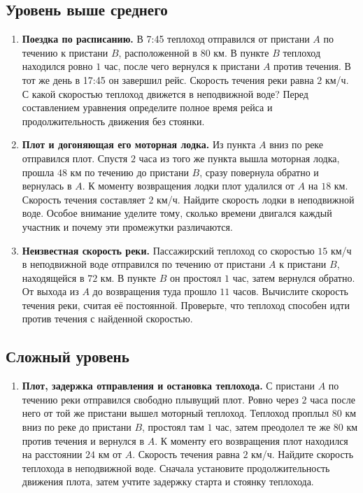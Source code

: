 \documentclass[a4paper,12pt]{article}
\begin{document}
\subsection*{Уровень выше среднего}
\begin{enumerate}[label=\textcolor{accent}{\bfseries\arabic*.},leftmargin=8mm,itemsep=12pt,start=7]
\item \textbf{Поездка по расписанию.} В 7:45 теплоход отправился от пристани $A$ по течению к пристани $B$, расположенной в $80$ км. В пункте $B$ теплоход находился ровно $1$ час, после чего вернулся к пристани $A$ против течения. В тот же день в 17:45 он завершил рейс. Скорость течения реки равна $2$ км/ч. С какой скоростью теплоход движется в неподвижной воде? Перед составлением уравнения определите полное время рейса и продолжительность движения без стоянки.

\item \textbf{Плот и догоняющая его моторная лодка.} Из пункта $A$ вниз по реке отправился плот. Спустя $2$ часа из того же пункта вышла моторная лодка, прошла $48$ км по течению до пристани $B$, сразу повернула обратно и вернулась в $A$. К моменту возвращения лодки плот удалился от $A$ на $18$ км. Скорость течения составляет $2$ км/ч. Найдите скорость лодки в неподвижной воде. Особое внимание уделите тому, сколько времени двигался каждый участник и почему эти промежутки различаются.

\item \textbf{Неизвестная скорость реки.} Пассажирский теплоход со скоростью $15$ км/ч в неподвижной воде отправился по течению от пристани $A$ к пристани $B$, находящейся в $72$ км. В пункте $B$ он простоял $1$ час, затем вернулся обратно. От выхода из $A$ до возвращения туда прошло $11$ часов. Вычислите скорость течения реки, считая её постоянной. Проверьте, что теплоход способен идти против течения с найденной скоростью.
\end{enumerate}

\subsection*{Сложный уровень}
\begin{enumerate}[label=\textcolor{accent}{\bfseries\arabic*.},leftmargin=8mm,itemsep=10pt,start=10]
\item \textbf{Плот, задержка отправления и остановка теплохода.} С пристани $A$ по течению реки отправился свободно плывущий плот. Ровно через $2$ часа после него от той же пристани вышел моторный теплоход. Теплоход проплыл $80$ км вниз по реке до пристани $B$, простоял там $1$ час, затем преодолел те же $80$ км против течения и вернулся в $A$. К моменту его возвращения плот находился на расстоянии $24$ км от $A$. Скорость течения равна $2$ км/ч. Найдите скорость теплохода в неподвижной воде. Сначала установите продолжительность движения плота, затем учтите задержку старта и стоянку теплохода.
\end{enumerate}
\end{document}
